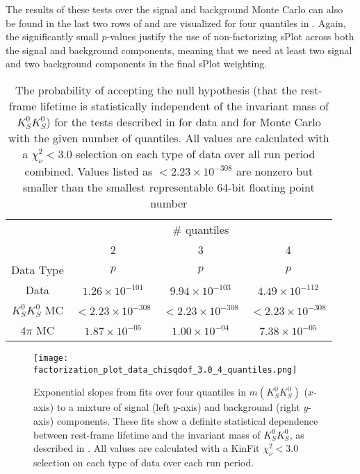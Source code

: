 The results of these tests over the signal and background Monte Carlo can also be found in the last two rows of  and are visualized for four quantiles in . Again, the significantly small $p$-values justify the use of non-factorizing sPlot across both the signal and background components, meaning that we need at least two signal and two background components in the final sPlot weighting.

\begin{table}
  \begin{center}
    \begin{tabular}{cccc}\toprule
       & \multicolumn{3}{c}{\# quantiles} \\\cmidrule(lr){2-4}
       & 2 & 3 & 4 \\
       Data Type & $p$ & $p$ & $p$ \\\midrule
      Data  & $1.26 \times 10^{-101}$ & $9.94 \times 10^{-103}$ & $4.49 \times 10^{-112}$\\
      $K_S^0K_S^0$ MC  & $<2.23\times 10^{-308}$ & $<2.23\times 10^{-308}$ & $<2.23\times 10^{-308}$\\
      $4\pi$ MC  & $1.87 \times 10^{-05}$ & $1.00 \times 10^{-04}$ & $7.38 \times 10^{-05}$\\\bottomrule
    \end{tabular}
    \caption{The probability of accepting the null hypothesis (that the rest-frame lifetime is statistically independent of the invariant mass of $K_S^0K_S^0$) for the tests described in  for data and  for Monte Carlo with the given number of quantiles. All values are calculated with a $\chi^2_\nu < 3.0$ selection on each type of data over all run period combined. Values listed as $<2.23 \times 10^{-308}$ are nonzero but smaller than the smallest representable 64-bit floating point number}\label{tab:factorization-results}
  \end{center}
\end{table}

\begin{figure}
  \begin{center}
    \texttt{[image: factorization\_plot\_data\_chisqdof\_3.0\_4\_quantiles.png]}
  \end{center}
  \caption{Exponential slopes from fits over four quantiles in $m(K_S^0K_S^0)$ ($x$-axis) to a mixture of signal (left $y$-axis) and background (right $y$-axis) components. These fits show a definite statistical dependence between rest-frame lifetime and the invariant mass of $K_S^0K_S^0$, as described in . All values are calculated with a KinFit $\chi^2_\nu < 3.0$ selection on each type of data over each run period.}\label{fig:data-factorization-fit}
\end{figure}

